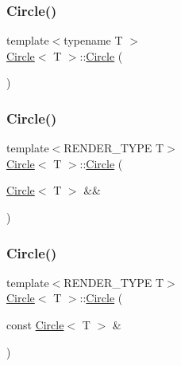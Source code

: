 \subsubsection{\texorpdfstring{Circle()}{Circle()}\hspace{0.1cm}{\footnotesize\ttfamily [3/5]}}
{\footnotesize\ttfamily template$<$typename T $>$ \\
\mbox{\hyperlink{classCircle}{Circle}}$<$ T $>$\+::\mbox{\hyperlink{classCircle}{Circle}} (\begin{DoxyParamCaption}{ }\end{DoxyParamCaption})}

\mbox{\label{classCircle_ad4ee8eadfd4201a937af204ac4e6ec37}} 
\subsubsection{\texorpdfstring{Circle()}{Circle()}\hspace{0.1cm}{\footnotesize\ttfamily [4/5]}}
{\footnotesize\ttfamily template$<$R\+E\+N\+D\+E\+R\+\_\+\+T\+Y\+PE T$>$ \\
\mbox{\hyperlink{classCircle}{Circle}}$<$ T $>$\+::\mbox{\hyperlink{classCircle}{Circle}} (\begin{DoxyParamCaption}\item[{\mbox{\hyperlink{classCircle}{Circle}}$<$ T $>$ \&\&}]{ }\end{DoxyParamCaption})\hspace{0.3cm}{\ttfamily [default]}}

\mbox{\label{classCircle_a163162aa8beaceb25ebd9a17966f4bd5}} 
\subsubsection{\texorpdfstring{Circle()}{Circle()}\hspace{0.1cm}{\footnotesize\ttfamily [5/5]}}
{\footnotesize\ttfamily template$<$R\+E\+N\+D\+E\+R\+\_\+\+T\+Y\+PE T$>$ \\
\mbox{\hyperlink{classCircle}{Circle}}$<$ T $>$\+::\mbox{\hyperlink{classCircle}{Circle}} (\begin{DoxyParamCaption}\item[{const \mbox{\hyperlink{classCircle}{Circle}}$<$ T $>$ \&}]{ }\end{DoxyParamCaption})\hspace{0.3cm}{\ttfamily [default]}}




